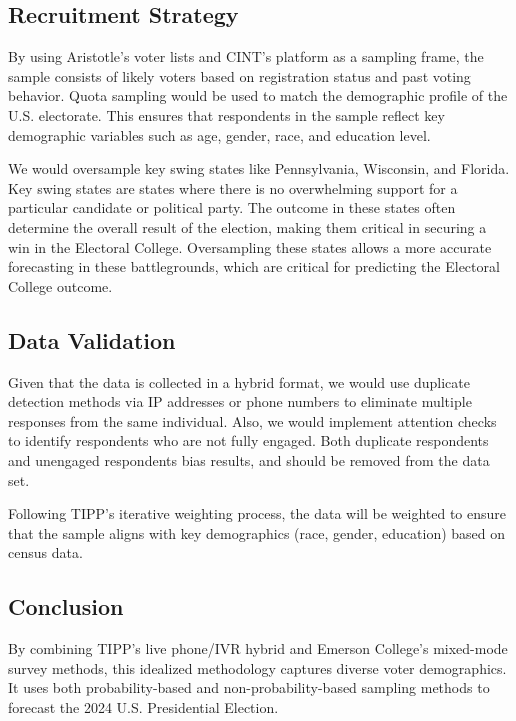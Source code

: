 \documentclass[
  letterpaper,
  DIV=11,
  numbers=noendperiod]{scrartcl}
\begin{document}
\hypertarget{recruitment-strategy}{%
\subsection{Recruitment Strategy}\label{recruitment-strategy}}

By using Aristotle's voter lists and CINT's platform as a sampling
frame, the sample consists of likely voters based on registration status
and past voting behavior. Quota sampling would be used to match the
demographic profile of the U.S. electorate. This ensures that
respondents in the sample reflect key demographic variables such as age,
gender, race, and education level.

We would oversample key swing states like Pennsylvania, Wisconsin, and
Florida. Key swing states are states where there is no overwhelming
support for a particular candidate or political party. The outcome in
these states often determine the overall result of the election, making
them critical in securing a win in the Electoral College. Oversampling
these states allows a more accurate forecasting in these battlegrounds,
which are critical for predicting the Electoral College outcome.

\hypertarget{data-validation}{%
\subsection{Data Validation}\label{data-validation}}

Given that the data is collected in a hybrid format, we would use
duplicate detection methods via IP addresses or phone numbers to
eliminate multiple responses from the same individual. Also, we would
implement attention checks to identify respondents who are not fully
engaged. Both duplicate respondents and unengaged respondents bias
results, and should be removed from the data set.

Following TIPP's iterative weighting process, the data will be weighted
to ensure that the sample aligns with key demographics (race, gender,
education) based on census data.

\hypertarget{conclusion-1}{%
\subsection{Conclusion}\label{conclusion-1}}

By combining TIPP's live phone/IVR hybrid and Emerson College's
mixed-mode survey methods, this idealized methodology captures diverse
voter demographics. It uses both probability-based and
non-probability-based sampling methods to forecast the 2024 U.S.
Presidential Election.
\end{document}
